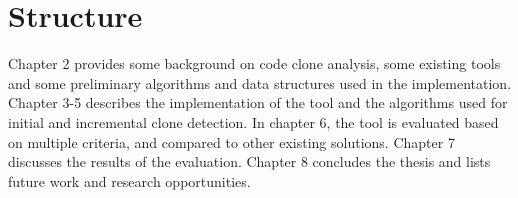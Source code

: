 \section{Structure}

Chapter 2 provides some background on code clone analysis, some existing tools and some
preliminary algorithms and data structures used in the implementation. Chapter 3-5
describes the implementation of the tool and the algorithms used for initial and
incremental clone detection. In chapter 6, the tool is evaluated based on multiple
criteria, and compared to other existing solutions. Chapter 7 discusses the results of the
evaluation. Chapter 8 concludes the thesis and lists future work and research
opportunities.
